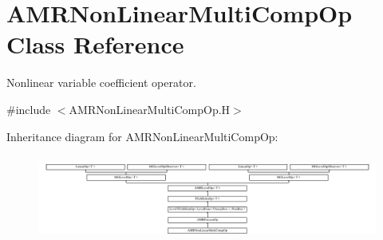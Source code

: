 \hypertarget{class_a_m_r_non_linear_multi_comp_op}{}\section{A\+M\+R\+Non\+Linear\+Multi\+Comp\+Op Class Reference}
\label{class_a_m_r_non_linear_multi_comp_op}


Nonlinear variable coefficient operator.  




{\ttfamily \#include $<$A\+M\+R\+Non\+Linear\+Multi\+Comp\+Op.\+H$>$}

Inheritance diagram for A\+M\+R\+Non\+Linear\+Multi\+Comp\+Op\+:\begin{figure}[H]
\begin{center}
\leavevmode
\includegraphics[height=2.865497cm]{class_a_m_r_non_linear_multi_comp_op}
\end{center}
\end{figure}
